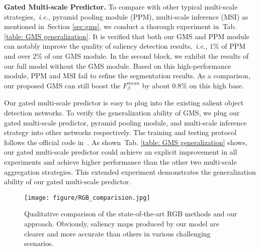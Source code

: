 \documentclass[journal]{IEEEtran}
\def\ie{{\em i.e.}}
\newcommand{\tabref}[1]{Tab. \ref{#1}}
\newcommand{\secref}[1]{Section \ref{#1}}
\begin{document}
\textbf{Gated Multi-scale Predictor.}
To compare with other typical multi-scale strategies,~\ie, pyramid pooling module (PPM), multi-scale inference (MSI) as mentioned in~\secref{sec:gms}, we conduct a thorough experiment in~\tabref{table: GMS generalization}. It is verified that both our GMS and PPM module can notably improve the quality of saliency detection results,~\ie, $1\%$ of PPM and over $2\%$ of our GMS module. In the second block, we exhibit the results of our full model without the GMS module. Based on this high-performance module, PPM and MSI fail to refine the segmentation results.
As a comparison, our proposed GMS can still boost the $F_\beta^{mean}$ by about $0.8\%$ on this high base.


Our gated multi-scale predictor is easy to plug into the existing salient object detection networks. To verify the generalization ability of GMS, we plug our gated multi-scale predictor, pyramid pooling module, and multi-scale inference strategy into other networks respectively. The training and testing protocol follows the official code in~\cite{zhang2020uc}.
As shown~\tabref{table: GMS generalization} shows, our gated multi-scale predictor could achieve an explicit improvement in all experiments and achieve higher performance than the other two multi-scale aggregation strategies. This extended experiment demonstrates the generalization ability of our gated multi-scale predictor.




















\linespread{1}
\begin{figure}[t]
	\begin{center}
\texttt{[image: figure/RGB\_comparision.jpg]}
		\caption{Qualitative comparison of the state-of-the-art RGB methods and our approach. Obviously, saliency maps produced by our model are clearer and more accurate than others in various challenging scenarios.
		}\label{fig:RGB comparison}
	\end{center}
\end{figure}
\end{document}
